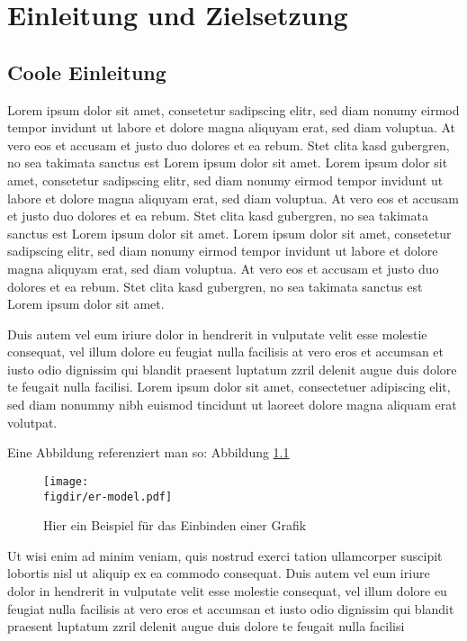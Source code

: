 \chapter{Einleitung und Zielsetzung}
\label{chap:Einleitung und Zielsetzung}
\section{Coole Einleitung}
\label{sec:Coole Einleitung}
Lorem ipsum dolor sit amet, consetetur sadipscing elitr, sed diam nonumy eirmod tempor invidunt ut labore et dolore magna aliquyam erat, sed diam voluptua. At vero eos et accusam et justo duo dolores et ea rebum. Stet clita kasd gubergren, no sea takimata sanctus est Lorem ipsum dolor sit amet. Lorem ipsum dolor sit amet, consetetur sadipscing elitr, sed diam nonumy eirmod tempor invidunt ut labore et dolore magna aliquyam erat, sed diam voluptua. At vero eos et accusam et justo duo dolores et ea rebum. Stet clita kasd gubergren, no sea takimata sanctus est Lorem ipsum dolor sit amet. Lorem ipsum dolor sit amet, consetetur sadipscing elitr, sed diam nonumy eirmod tempor invidunt ut labore et dolore magna aliquyam erat, sed diam voluptua. At vero eos et accusam et justo duo dolores et ea rebum. Stet clita kasd gubergren, no sea takimata sanctus est Lorem ipsum dolor sit amet.

Duis autem vel eum iriure dolor in hendrerit in vulputate velit esse molestie consequat, vel illum dolore eu feugiat nulla facilisis at vero eros et accumsan et iusto odio dignissim qui blandit praesent luptatum zzril delenit augue duis dolore te feugait nulla facilisi. Lorem ipsum dolor sit amet, consectetuer adipiscing elit, sed diam nonummy nibh euismod tincidunt ut laoreet dolore magna aliquam erat volutpat.

Eine Abbildung referenziert man so: Abbildung \ref{fig:bsp}

\begin{figure}[ht]
\centering
\caption{Hier ein Beispiel für das Einbinden einer Grafik}
\label{fig:bsp}
\texttt{[image: \\figdir/er-model.pdf]}
\end{figure}

Ut wisi enim ad minim veniam, quis nostrud exerci tation ullamcorper suscipit lobortis nisl ut aliquip ex ea commodo consequat. Duis autem vel eum iriure dolor in hendrerit in vulputate velit esse molestie consequat, vel illum dolore eu feugiat nulla facilisis at vero eros et accumsan et iusto odio dignissim qui blandit praesent luptatum zzril delenit augue duis dolore te feugait nulla facilisi



